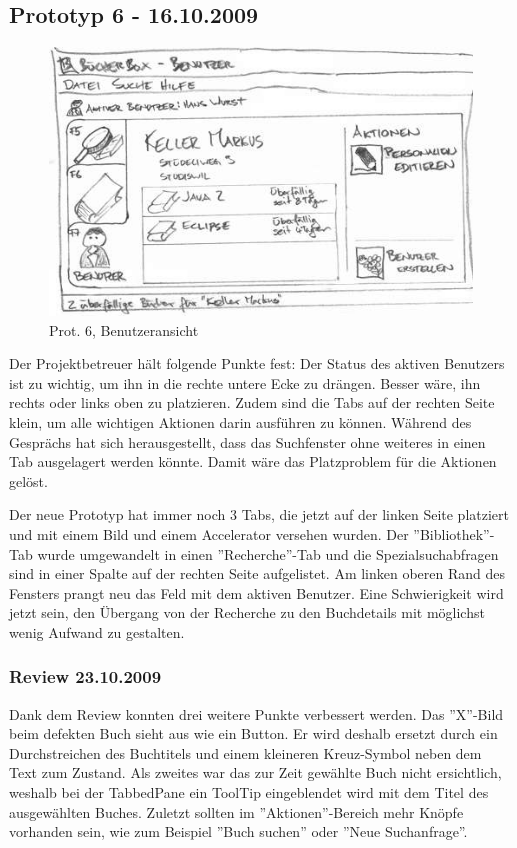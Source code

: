 \documentclass[10pt, a4paper]{scrartcl}
\begin{document}
\subsection{Prototyp 6 - 16.10.2009}
\begin{figure}
  \begin{center}
   \includegraphics{prototyp6Thumbnail} \\
   Prot. 6, Benutzeransicht
  \end{center}
\end{figure}
Der Projektbetreuer hält folgende Punkte fest: Der Status des aktiven Benutzers ist zu wichtig, um ihn in die rechte untere Ecke zu drängen. Besser wäre, ihn rechts oder links oben zu platzieren. Zudem sind die Tabs auf der rechten Seite klein, um alle wichtigen Aktionen darin ausführen zu können. 
Während des Gesprächs hat sich herausgestellt, dass das Suchfenster ohne weiteres in einen Tab ausgelagert werden könnte. Damit wäre das Platzproblem für die Aktionen gelöst. 

Der neue Prototyp hat immer noch 3 Tabs, die jetzt auf der linken Seite platziert und mit einem Bild und einem Accelerator versehen wurden. Der ''Bibliothek''-Tab wurde umgewandelt in einen ''Recherche''-Tab und die Spezialsuchabfragen sind in einer Spalte auf der rechten Seite aufgelistet. Am linken oberen Rand des Fensters prangt neu das Feld mit dem aktiven Benutzer. Eine Schwierigkeit wird jetzt sein, den Übergang von der Recherche zu den Buchdetails mit möglichst wenig Aufwand zu gestalten.

\subsubsection{Review 23.10.2009}
Dank dem Review konnten drei weitere Punkte verbessert werden. Das ''X''-Bild beim defekten Buch sieht aus wie ein Button. Er wird deshalb ersetzt durch ein Durchstreichen des Buchtitels und einem kleineren Kreuz-Symbol neben dem Text zum Zustand. Als zweites war das zur Zeit gewählte Buch nicht ersichtlich, weshalb bei der TabbedPane ein ToolTip eingeblendet wird mit dem Titel des ausgewählten Buches. Zuletzt sollten im ''Aktionen''-Bereich mehr Knöpfe vorhanden sein, wie zum Beispiel ''Buch suchen'' oder ''Neue Suchanfrage''.
\end{document}
